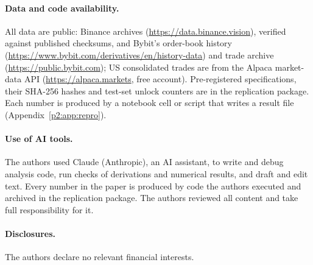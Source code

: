 \paragraph{Data and code availability.} All data are public: Binance archives (\url{https://data.binance.vision}), verified against published checksums, and Bybit's order-book history (\url{https://www.bybit.com/derivatives/en/history-data}) and trade archive (\url{https://public.bybit.com}); US consolidated trades are from the Alpaca market-data API (\url{https://alpaca.markets}, free account). Pre-registered specifications, their SHA-256 hashes and test-set unlock counters are in the replication package. Each number is produced by a notebook cell or script that writes a result file (Appendix~\ref{p2:app:repro}).

\paragraph{Use of AI tools.} The authors used Claude (Anthropic), an AI assistant, to write and debug analysis code, run checks of derivations and numerical results, and draft and edit text. Every number in the paper is produced by code the authors executed and archived in the replication package. The authors reviewed all content and take full responsibility for it.

\paragraph{Disclosures.} The authors declare no relevant financial interests.

